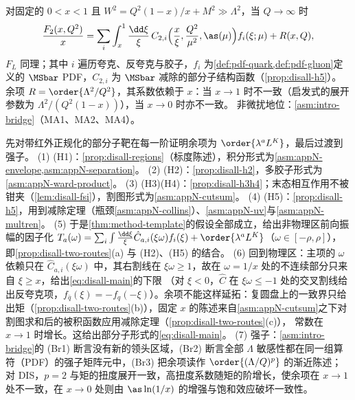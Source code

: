 \begin{theorem}\label{thm:disall-factorization}
对固定的 $0<x<1$ 且 $W^2=Q^2(1-x)/x+M^2\gg\Lambda^2$，当 $Q\to\infty$ 时
\begin{equation}\label{eq:disall-main}
\frac{F_2(x,Q^2)}{x}=\sum_i\int_x^1\frac{\dd\xi}{\xi}\,C_{2,i}\Big(\frac x\xi,\frac{Q^2}{\mu^2},\as(\mu)\Big)f_i(\xi;\mu)+R(x,Q),
\end{equation}
$F_L$ 同理；其中 $i$ 遍历夸克、反夸克与胶子，$f_i$ 为\cref{def:pdf-quark,def:pdf-gluon}定义的 $\MSbar$ PDF，$C_{2,i}$ 为 $\MSbar$ 减除的部分子结构函数（\cref{prop:disall-h5}）。
余项 $R=\order{\Lambda^2/Q^2}$，其系数依赖于 $x$：当 $x\to1$ 时不一致（启发式的展开参数为 $\Lambda^2/(Q^2(1-x))$），当 $x\to0$ 时亦不一致。
非微扰地位：\cref{asm:intro-bridge}（MA1、MA2、MA4）。
\end{theorem}

\begin{proofsketch}
先对带红外正规化的部分子靶在每一阶证明余项为 $\order{\lambda^aL^K}$，最后过渡到强子。
(1) (H1)：\cref{prop:disall-regions}（标度陈述），积分形式为\cref{asm:appN-envelope,asm:appN-separation}。
(2) (H2)：\cref{prop:disall-h2}，多胶子形式为\cref{asm:appN-ward-product}。
(3) (H3)(H4)：\cref{prop:disall-h3h4}；末态相互作用不被钳夹（\cref{lem:disall-fsi}），割图形式为\cref{asm:appN-cutsum}。
(4) (H5)：\cref{prop:disall-h5}，用到减除定理（瓶颈\cref{asm:appN-collins}）、\cref{asm:appN-uv}与\cref{asm:appN-multren}。
(5) 于是\cref{thm:method-template}的假设全部成立，给出非物理区前向振幅的因子化 $T_a(\omega)=\sum_i\int\frac{\dd\xi}{\xi}\hat C_{a,i}(\xi\omega)f_i(\xi)+\order{\lambda^aL^K}$（$\omega\in[-\rho,\rho]$），
即\cref{prop:disall-two-routes}(a) 与 (H2)、(H5) 的结合。
(6) 回到物理区：主项的 $\omega$ 依赖只在 $\hat C_{a,i}(\xi\omega)$ 中，其右割线在 $\xi\omega\ge1$，故在 $\omega=1/x$ 处的不连续部分只来自 $\xi\ge x$，给出\cref{eq:disall-main}的下限
（对 $\xi<0$，$\hat C$ 在 $\xi\omega\le-1$ 处的交叉割线给出反夸克项，$f_{\bar q}(\xi)=-f_q(-\xi)$）。余项不能这样延拓：复圆盘上的一致界只给出矩（\cref{prop:disall-two-routes}(b)），固定 $x$ 的陈述来自\cref{asm:appN-cutsum}之下对割图求和后的被积函数应用减除定理（\cref{prop:disall-two-routes}(c)），
常数在 $x\to1$ 时增长。这给出部分子形式的\cref{eq:disall-main}。
(7) 强子：\cref{asm:intro-bridge}的 (Br1) 断言没有新的领头区域，(Br2) 断言全部 $\Lambda$ 敏感性都在同一组算符（PDF）的强子矩阵元中，(Br3) 把余项读作 $\order{(\Lambda/Q)^p}$ 的渐近陈述；
对 DIS，$p=2$ 与矩的扭度展开一致，高扭度系数随矩的阶增长，使余项在 $x\to1$ 处不一致，在 $x\to0$ 处则由 $\as\ln(1/x)$ 的增强与饱和效应破坏一致性。
\end{proofsketch}

